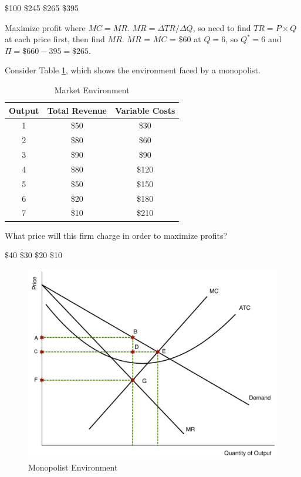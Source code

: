 \documentclass[addpoints,11pt]{exam}
\theoremstyle{definition}
\begin{document}
\begin{questions}
			\begin{choices}
				\choice \$100
				\choice \$245
				\CorrectChoice \$265
				\choice \$395
			\end{choices}
			
			\begin{solution}
				Maximize profit where $MC = MR$. $MR = \Delta TR/\Delta Q$, so need to find $TR = P\times Q$ at each price first, then find $MR$. $MR$ = $MC$ = \$60 at $Q=6$, so $Q^* =6$ and $\Pi = \$660 - 395 = \$265$.
			\end{solution}
			
\question Consider Table \ref{Mc}, which shows the environment faced by a monopolist.


\begin{table}[H]
	\caption{Market Environment}
	\label{Mc}
	\centering
	\begin{tabular}{  c| c | c }   
		Output & Total Revenue &  Variable Costs \\     
		\hline
		1 & \$50 & \$30 \\
		2 & \$80 & \$60 \\
		3 & \$90 & \$90 \\
		4 & \$80 & \$120  \\
		5 & \$50& \$150 \\
		6 & \$20& \$180 \\
		7 & \$10 & \$210 \\
	\end{tabular}
\end{table}

What price will this firm charge in order to maximize profits?

\begin{choices}
	\CorrectChoice \$40
	\choice \$30
	\choice \$20
	\choice \$10
\end{choices}



\begin{figure}[H]
	\centering
	\includegraphics[scale=.4]{Exam2_MC10.pdf}
	\caption{Monopolist Environment}
	\label{MC10}
\end{figure}



\end{questions}
\end{document}
